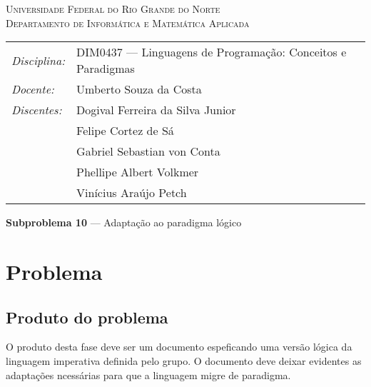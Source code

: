 \documentclass[12pt, a4paper]{article}
\begin{document}
\begin{center}
    \textsc{Universidade Federal do Rio Grande do Norte} \\
    \textsc{Departamento de Informática e Matemática Aplicada}
\end{center}

\bigskip

\begin{tabular}{@{}ll@{}}
    \emph{Disciplina:} & DIM0437 --- Linguagens de Programação:
                            Conceitos e Paradigmas \\
    \emph{Docente:}    & Umberto Souza da Costa \\
    \emph{Discentes:}  & Dogival Ferreira da Silva Junior \\
                       & Felipe Cortez de Sá \\
                       & Gabriel Sebastian von Conta \\
                       & Phellipe Albert Volkmer \\
                       & Vinícius Araújo Petch
\end{tabular}

\bigskip

\begin{center}
\large \textbf{Subproblema 10} --- Adaptação ao paradigma lógico
\end{center}

\section{Problema}
    \subsection{Produto do problema}
    O produto desta fase deve ser um documento espeficando uma versão lógica da
    linguagem imperativa definida pelo grupo. O documento deve deixar evidentes
    as adaptações ncessárias para que a linguagem migre de paradigma.
\end{document}
